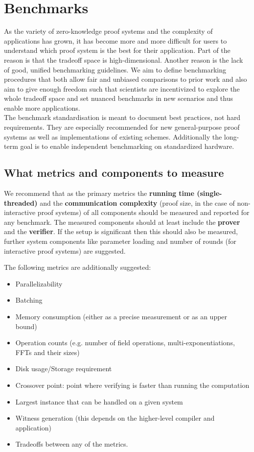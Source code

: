 \section{Benchmarks}

As the variety of zero-knowledge proof systems and the complexity of applications has grown, it has become more and more difficult for users to understand which proof system is the best for their application. Part of the reason is that the tradeoff space is high-dimensional. Another reason is the lack of good, unified benchmarking guidelines. We aim to define benchmarking procedures that both allow fair and unbiased comparisons to prior work and also aim to give enough freedom such that scientists are incentivized to explore the whole tradeoff space and set nuanced benchmarks in new scenarios and thus enable more applications.\\
The benchmark standardisation is meant to document best practices, not hard requirements. They are especially recommended for new general-purpose proof systems as well as implementations of existing schemes. Additionally the long-term goal is to enable independent benchmarking on standardized hardware.


\subsection{What metrics and components to measure}

We recommend that as the primary metrics the \textbf{running time (single-threaded)} and the \textbf{communication complexity} (proof size, in the case of non-interactive proof systems) of all components should be measured and reported for any benchmark. The measured components should at least include the \textbf{prover} and the \textbf{verifier}. If the setup is significant then this should also be measured, further system components like parameter loading and number of rounds (for interactive proof systems) are suggested.

The following metrics are additionally suggested:
\begin{itemize}[label={- }]
\item Parallelizability
\item Batching
\item Memory consumption (either as a precise measurement or as an upper bound)
\item Operation counts (e.g. number of field operations, multi-exponentiations, FFTs and their sizes)
\item Disk usage/Storage requirement
\item Crossover point: point where verifying is faster than running the computation
\item Largest instance that can be handled on a given system
\item Witness generation (this depends on the higher-level compiler and application)
\item Tradeoffs between any of the metrics.
\end{itemize}



